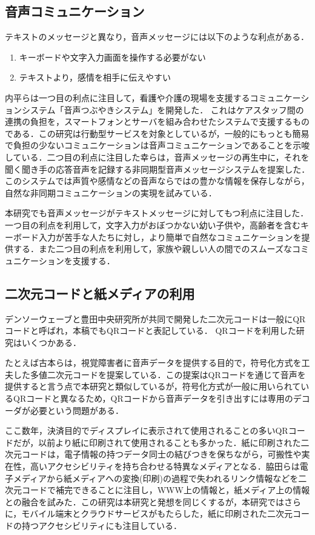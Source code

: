 \documentclass[submit,techrep,noauthor]{ipsj}
\begin{document}
\subsection{音声コミュニケーション}
テキストのメッセージと異なり，音声メッセージには以下のような利点がある．
\begin{enumerate}
    \item キーボードや文字入力画面を操作する必要がない
    \item テキストより，感情を相手に伝えやすい
\end{enumerate}
内平ら\cite{tsubuyaki-service}は一つ目の利点に注目して，看護や介護の現場を支援するコミュニケーションシステム「音声つぶやきシステム」を開発した． これはケアスタッフ間の連携の負担を，スマートフォンとサーバを組み合わせたシステムで支援するものである．この研究は行動型サービスを対象としているが，一般的にもっとも簡易で負担の少ないコミュニケーションは音声コミュニケーションであることを示唆している．二つ目の利点に注目した幸ら\cite{asynchronous-message}は，音声メッセージの再生中に，それを聞く聞き手の応答音声を記録する非同期型音声メッセージシステムを提案した．このシステムでは声質や感情などの音声ならではの豊かな情報を保存しながら，自然な非同期コミュニケーションの実現を試みている．\par 
本研究でも音声メッセージがテキストメッセージに対してもつ利点に注目した．一つ目の利点を利用して，文字入力がおぼつかない幼い子供や，高齢者を含むキーボード入力が苦手な人たちに対し，より簡単で自然なコミュニケーションを提供する．また二つ目の利点を利用して，家族や親しい人の間でのスムーズなコミュニケーションを支援する．

\subsection{二次元コードと紙メディアの利用}
デンソーウェーブと豊田中央研究所が共同で開発した二次元コード\cite{qr-patent}は一般にQRコード\cite{qr-jis}と呼ばれ，本稿でもQRコードと表記している．
QRコードを利用した研究はいくつかある．\par
たとえば古本ら\cite{qr-1}は，視覚障害者に音声データを提供する目的で，符号化方式を工夫した多値二次元コードを提案している．この提案はQRコードを通じて音声を提供すると言う点で本研究と類似しているが，符号化方式が一般に用いられているQRコードと異なるため，QRコードから音声データを引き出すには専用のデコーダが必要という問題がある．\par
ここ数年，決済目的でディスプレイに表示されて使用されることの多い\cite{white_paper_infor_commun_japan-2}QRコードだが，以前より紙に印刷されて使用されることも多かった．紙に印刷された二次元コードは，電子情報の持つデータ同士の結びつきを保ちながら，可搬性や実在性，高いアクセシビリティを持ち合わせる特異なメディアとなる．脇田ら\cite{qr-2}は電子メディアから紙メディアへの変換(印刷)の過程で失われるリンク情報などを二次元コードで補完できることに注目し，WWW上の情報と，紙メディア上の情報との融合を試みた．この研究は本研究と発想を同じくするが，本研究ではさらに，モバイル端末とクラウドサービスがもたらした，紙に印刷された二次元コードの持つアクセシビリティにも注目している．
\end{document}
